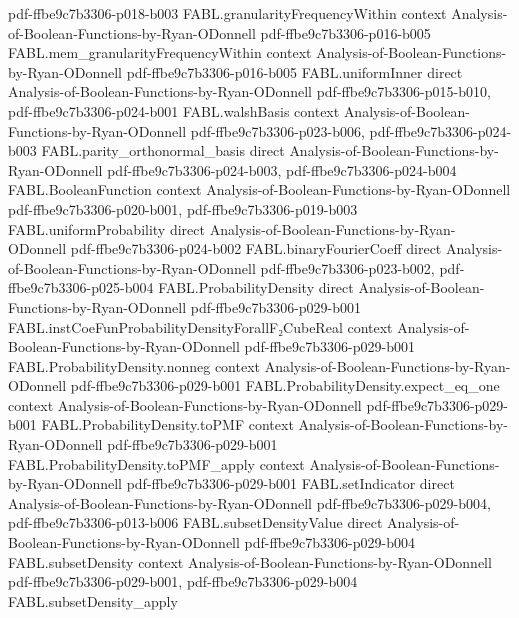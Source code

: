\begin{theorem}
{    pdf-ffbe9c7b3306-p018-b003}
\proofstep
  {FABL.granularityFrequencyWithin}
  {context}
  {Analysis-of-Boolean-Functions-by-Ryan-ODonnell}
  {pdf-ffbe9c7b3306-p016-b005}
\proofstep
  {FABL.mem_granularityFrequencyWithin}
  {context}
  {Analysis-of-Boolean-Functions-by-Ryan-ODonnell}
  {pdf-ffbe9c7b3306-p016-b005}
\proofstep
  {FABL.uniformInner}
  {direct}
  {Analysis-of-Boolean-Functions-by-Ryan-ODonnell}
  {pdf-ffbe9c7b3306-p015-b010,
    pdf-ffbe9c7b3306-p024-b001}
\proofstep
  {FABL.walshBasis}
  {context}
  {Analysis-of-Boolean-Functions-by-Ryan-ODonnell}
  {pdf-ffbe9c7b3306-p023-b006,
    pdf-ffbe9c7b3306-p024-b003}
\proofstep
  {FABL.parity_orthonormal_basis}
  {direct}
  {Analysis-of-Boolean-Functions-by-Ryan-ODonnell}
  {pdf-ffbe9c7b3306-p024-b003,
    pdf-ffbe9c7b3306-p024-b004}
\proofstep
  {FABL.BooleanFunction}
  {context}
  {Analysis-of-Boolean-Functions-by-Ryan-ODonnell}
  {pdf-ffbe9c7b3306-p020-b001,
    pdf-ffbe9c7b3306-p019-b003}
\proofstep
  {FABL.uniformProbability}
  {direct}
  {Analysis-of-Boolean-Functions-by-Ryan-ODonnell}
  {pdf-ffbe9c7b3306-p024-b002}
\proofstep
  {FABL.binaryFourierCoeff}
  {direct}
  {Analysis-of-Boolean-Functions-by-Ryan-ODonnell}
  {pdf-ffbe9c7b3306-p023-b002,
    pdf-ffbe9c7b3306-p025-b004}
\proofstep
  {FABL.ProbabilityDensity}
  {direct}
  {Analysis-of-Boolean-Functions-by-Ryan-ODonnell}
  {pdf-ffbe9c7b3306-p029-b001}
\proofstep
  {FABL.instCoeFunProbabilityDensityForallF₂CubeReal}
  {context}
  {Analysis-of-Boolean-Functions-by-Ryan-ODonnell}
  {pdf-ffbe9c7b3306-p029-b001}
\proofstep
  {FABL.ProbabilityDensity.nonneg}
  {context}
  {Analysis-of-Boolean-Functions-by-Ryan-ODonnell}
  {pdf-ffbe9c7b3306-p029-b001}
\proofstep
  {FABL.ProbabilityDensity.expect_eq_one}
  {context}
  {Analysis-of-Boolean-Functions-by-Ryan-ODonnell}
  {pdf-ffbe9c7b3306-p029-b001}
\proofstep
  {FABL.ProbabilityDensity.toPMF}
  {context}
  {Analysis-of-Boolean-Functions-by-Ryan-ODonnell}
  {pdf-ffbe9c7b3306-p029-b001}
\proofstep
  {FABL.ProbabilityDensity.toPMF_apply}
  {context}
  {Analysis-of-Boolean-Functions-by-Ryan-ODonnell}
  {pdf-ffbe9c7b3306-p029-b001}
\proofstep
  {FABL.setIndicator}
  {direct}
  {Analysis-of-Boolean-Functions-by-Ryan-ODonnell}
  {pdf-ffbe9c7b3306-p029-b004,
    pdf-ffbe9c7b3306-p013-b006}
\proofstep
  {FABL.subsetDensityValue}
  {direct}
  {Analysis-of-Boolean-Functions-by-Ryan-ODonnell}
  {pdf-ffbe9c7b3306-p029-b004}
\proofstep
  {FABL.subsetDensity}
  {context}
  {Analysis-of-Boolean-Functions-by-Ryan-ODonnell}
  {pdf-ffbe9c7b3306-p029-b001,
    pdf-ffbe9c7b3306-p029-b004}
\proofstep
  {FABL.subsetDensity_apply}

\end{theorem}
